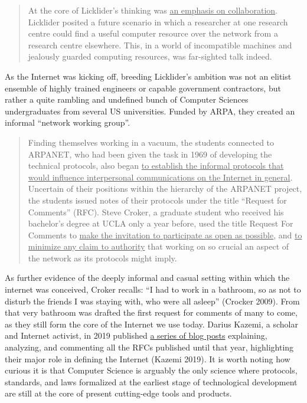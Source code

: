 \documentclass[
  a4paper,
]{book}
\begin{document}
\begin{quote}
At the core of Licklider's thinking was \uline{an emphasis on collaboration}. Licklider posited a future scenario in which a researcher at one research centre could find a useful computer resource over the network from a research centre elsewhere. This, in a world of incompatible machines and jealously guarded computing resources, was far-sighted talk indeed.
\end{quote}

As the Internet was kicking off, breeding Licklider's ambition was not an elitist ensemble of highly trained engineers or capable government contractors, but rather a quite rambling and undefined bunch of Computer Sciences undergraduates from several US universities. Funded by ARPA, they created an informal ``network working group''.

\begin{quote}
Finding themselves working in a vacuum, the students connected to ARPANET, who had been given the task in 1969 of developing the technical protocols, also began \uline{to establish the informal protocols that would influence interpersonal communications on the Internet in general}.\\
Uncertain of their positions within the hierarchy of the ARPANET project, the students issued notes of their protocols under the title ``Request for Comments'' (RFC). Steve Croker, a graduate student who received his bachelor's degree at UCLA only a year before, used the title Request For Comments to \uline{make the invitation to participate as open as possible}, and \uline{to minimize any claim to authority} that working on so crucial an aspect of the network as its protocols might imply.
\end{quote}

As further evidence of the deeply informal and casual setting within which the internet was conceived, Croker recalls: ``I had to work in a bathroom, so as not to disturb the friends I was staying with, who were all asleep'' {(Crocker 2009)}. From that very bathroom was drafted the first request for comments of many to come, as they still form the core of the Internet we use today. Darius Kazemi, a scholar and Internet activist, in 2019 published \href{https://write.as/365-rfcs/365-ietf-rfcs-a-50th-anniversary-dive}{a series of blog posts} explaining, analyzing, and commenting all the RFCs published until that year, highlighting their major role in defining the Internet {(Kazemi 2019)}. It is worth noting how curious it is that Computer Science is arguably the only science where protocols, standards, and laws formalized at the earliest stage of technological development are still at the core of present cutting-edge tools and products.
\end{document}
